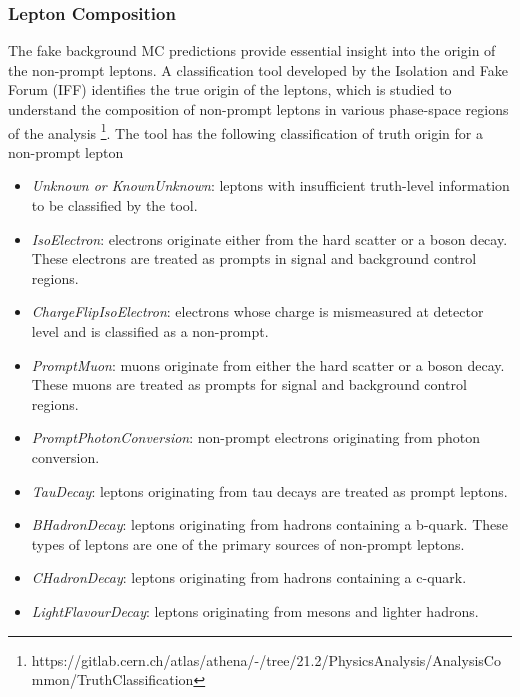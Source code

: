 \subsubsection{Lepton Composition}
\label{subsubsec:LepComp}
The fake background MC predictions provide essential insight into the origin of the non-prompt leptons. A classification tool developed by the Isolation and Fake Forum (IFF) identifies the true origin of the leptons, which is studied to understand the composition of non-prompt leptons in various phase-space regions of the analysis \footnote{https://gitlab.cern.ch/atlas/athena/-/tree/21.2/PhysicsAnalysis/AnalysisCommon/TruthClassification}. The tool has the following classification of truth origin for a non-prompt lepton

\begin{itemize}
    \item{ \textit{Unknown or KnownUnknown}: leptons with insufficient truth-level information to be classified by the tool.}
 
    \item { \textit{IsoElectron}: electrons originate either from the hard scatter or a boson decay. These electrons are treated as prompts in signal and background control regions.}
    
    \item{ \textit{ChargeFlipIsoElectron}: electrons whose charge is mismeasured at detector level and is classified as a non-prompt.}
    
    \item{ \textit{PromptMuon}: muons originate from either the hard scatter or a boson decay. These muons are treated as prompts for signal and background control regions.}
    
    \item{\textit{PromptPhotonConversion}: non-prompt electrons originating from photon conversion. }
    
    \item{\textit{TauDecay}: leptons originating from tau decays are treated as prompt leptons.}
    
    \item{\textit{BHadronDecay}: leptons originating from hadrons containing a b-quark. These types of leptons are one of the primary sources of non-prompt leptons.}
    
    \item{\textit{CHadronDecay}: leptons originating from hadrons containing a c-quark.}
    
    \item{\textit{LightFlavourDecay}: leptons originating from mesons and lighter hadrons.}

\end{itemize}


